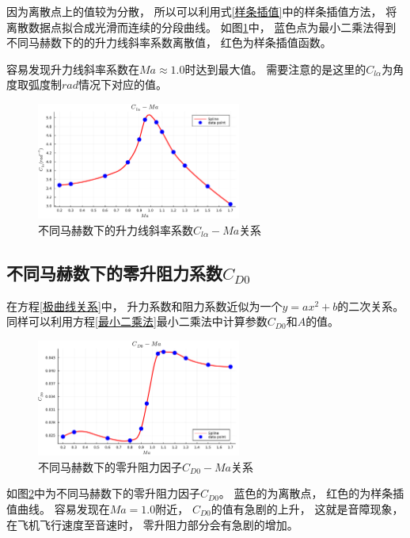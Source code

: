 因为离散点上的值较为分散，
所以可以利用式\ref{样条插值}中的样条插值方法，
将离散数据点拟合成光滑而连续的分段曲线。
如图\ref{不同马赫数下的升力线斜率系数关系}中，
蓝色点为最小二乘法得到不同马赫数下的的升力线斜率系数离散值，
红色为样条插值函数。

容易发现升力线斜率系数在$Ma\approx 1.0$时达到最大值。
需要注意的是这里的$C_{l\alpha}$为角度取弧度制$rad$情况下对应的值。

\begin{figure}[H]
    \centering
    \includegraphics[width=0.6\textwidth]{image/ch3/Clalpha_Ma.pdf}
    \caption{不同马赫数下的升力线斜率系数$C_{l\alpha}-Ma$关系}
    \label{不同马赫数下的升力线斜率系数关系}
\end{figure}





\subsection{不同马赫数下的零升阻力系数$C_{D0}$}

在方程\ref{极曲线关系}中，
升力系数和阻力系数近似为一个$y = ax^2+b$的二次关系。
同样可以利用方程\ref{最小二乘法}最小二乘法中计算参数$C_{D0}$和$A$的值。

\begin{figure}[H]
    \centering
    \includegraphics[width=0.6\textwidth]{image/ch3/CD0_Ma.pdf}
    \caption{不同马赫数下的零升阻力因子$C_{D0}-Ma$关系}
    \label{不同马赫数下的零升阻力因子关系}
\end{figure}

如图\ref{不同马赫数下的零升阻力因子关系}中为不同马赫数下的零升阻力因子$C_{D0}$。
蓝色的为离散点，
红色的为样条插值曲线。
容易发现在$Ma=1.0$附近，
$C_{D0}$的值有急剧的上升，
这就是音障现象，
在飞机飞行速度至音速时，
零升阻力部分会有急剧的增加。


